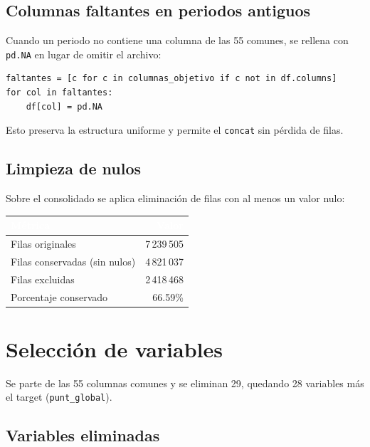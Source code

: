 \documentclass[12pt, a4paper]{article}
\newcommand{\thead}[1]{\cellcolor{tabheader}\textcolor{white}{\textbf{#1}}}
\begin{document}
\subsection{Columnas faltantes en periodos antiguos}

Cuando un periodo no contiene una columna de las 55 comunes, se rellena con
\texttt{pd.NA} en lugar de omitir el archivo:

\begin{lstlisting}
faltantes = [c for c in columnas_objetivo if c not in df.columns]
for col in faltantes:
    df[col] = pd.NA
\end{lstlisting}

Esto preserva la estructura uniforme y permite el \texttt{concat} sin pérdida de
filas.

\subsection{Limpieza de nulos}

Sobre el consolidado se aplica eliminación de filas con al menos un valor nulo:

\vspace{4pt}
\begin{tabular}{lr}
  \toprule
  \thead{Métrica} & \thead{Valor} \\
  \midrule
  \rowcolor{rowalt}
  Filas originales                 & 7\,239\,505 \\
  Filas conservadas (sin nulos)    & 4\,821\,037 \\
  \rowcolor{rowalt}
  Filas excluidas                  & 2\,418\,468 \\
  Porcentaje conservado            & 66.59\% \\
  \bottomrule
\end{tabular}

\section{Selección de variables}
\label{sec:features}

Se parte de las 55 columnas comunes y se eliminan 29, quedando 28 variables más
el target (\texttt{punt\_global}).

\subsection{Variables eliminadas}
\end{document}
